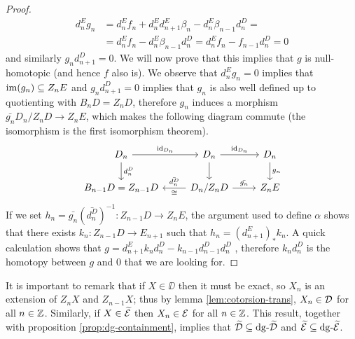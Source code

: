 \begin{proof}
\begin{align*}
		d_n^E g_n &= d_n^E f_n +d_n^E d_{n+1}^E \beta_n - d_n^E \beta_{n-1} d_n^D = \\
		& = d_n^E f_n - d_n^E \beta_{n-1} d_n^D = d_n^E f_n - f_{n-1}d_n^D =  0
	\end{align*} 
	and similarly $g_n d_{n+1}^D =0 $. We will now prove that this implies that $g$ is null-homotopic (and hence $f$ also is). We observe that $d_n^E g_n = 0$ implies that $\operatorname{im}(g_n) \subseteq Z_n E$ and $g_n d_{n+1}^D =0 $ implies that $g_n$ is also well defined up to quotienting with $B_n D = Z_n D$, therefore $g_n$ induces a morphism $\bar{g_n} D_n / Z_n D \longrightarrow Z_n E$, which makes the following diagram commute (the isomorphism is the first isomorphism theorem).
	\[\begin{tikzcd}
		{D_n} & {D_n} & {D_n} \\
		{B_{n-1}D = Z_{n-1}D} & {D_n/Z_nD} & {Z_n E}
		\arrow["{\id_{D_n}}", from=1-1, to=1-2]
		\arrow["{d_n^D}", from=1-1, to=2-1]
		\arrow["{\id_{D_n}}", from=1-2, to=1-3]
		\arrow[from=1-2, to=2-2]
		\arrow["{g_n}", from=1-3, to=2-3]
		\arrow["{\bar{d_n^D}}"', "\cong", from=2-2, to=2-1]
		\arrow["{\bar{g_n}}", from=2-2, to=2-3]
	\end{tikzcd}\]
	If we set $h_n = {\bar{g_n}}\left({\bar{d_n^D}}\right)^{-1} \colon Z_{n-1}D \longrightarrow Z_n E$, the argument used to define $\alpha$ shows that there exists $k_n \colon Z_{n-1} D \longrightarrow E_{n+1}$ such that $h_n = \left(d_{n+1}^E\right)_*k_n$. A quick calculation shows that $g = d_{n+1}^Ek_n d_n^D  - k_{n-1}d_{n-1}^D d_n^D$ , therefore $k_n d_n^D$ is the homotopy between $g$ and $0$ that we are looking for.
\end{proof}

It is important to remark that if $X \in \DD$ then it must be exact, so $X_n$ is an extension of $Z_nX$ and $Z_{n-1}X$; thus by lemma \ref{lem:cotorsion-trans}, $X_n \in \mathcal{D}$ for all $n \in \mathbb{Z}$. Similarly, if $X \in \widetilde{\mathcal{E}}$ then $X_n \in \mathcal{E}$ for all $n \in \mathbb{Z}$. This result, together with proposition \ref{prop:dg-containment}, implies that $\widetilde{\mathcal{D}} \subseteq \mathrm{dg} \text{-}\widetilde{\mathcal{D}}$ and $\widetilde{\mathcal{E}} \subseteq \mathrm{dg} \text{-}\widetilde{\mathcal{E}}$.

